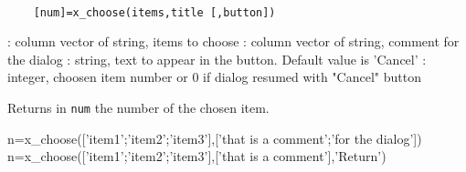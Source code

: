 
\begin{mandesc}
  \\ %
\end{mandesc}
\begin{calling_sequence}
  \begin{verbatim}
    [num]=x_choose(items,title [,button])   
  \end{verbatim}
\end{calling_sequence}
\begin{parameters}
  \begin{varlist}
     : column vector of string,  items to choose
     : column vector of string, comment for the dialog
     :  string, text to appear in the button. Default value is 'Cancel'
     : integer, choosen item number or 0 if dialog resumed with "Cancel" button
  \end{varlist}
\end{parameters}
\begin{mandescription}
  Returns in \verb!num! the number of the chosen item.
\end{mandescription}

\begin{examples}
  \begin{program}
    n=x_choose(['item1';'item2';'item3'],['that is a comment';'for the dialog'])
    n=x_choose(['item1';'item2';'item3'],['that is a comment'],'Return')
  \end{program}
\end{examples}
\begin{manseealso}
\end{manseealso}

